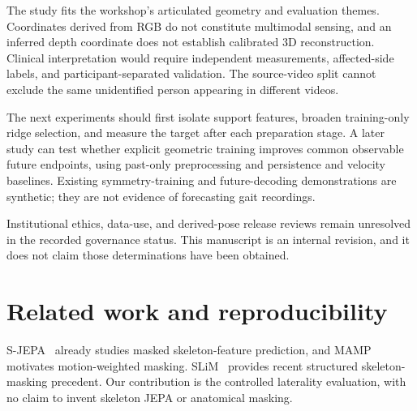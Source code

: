 \documentclass{article}
\begin{document}
The study fits the workshop's articulated geometry and evaluation themes. Coordinates derived from RGB do not constitute multimodal sensing, and an inferred depth coordinate does not establish calibrated 3D reconstruction. Clinical interpretation would require independent measurements, affected-side labels, and participant-separated validation. The source-video split cannot exclude the same unidentified person appearing in different videos.

The next experiments should first isolate support features, broaden training-only ridge selection, and measure the target after each preparation stage. A later study can test whether explicit geometric training improves common observable future endpoints, using past-only preprocessing and persistence and velocity baselines. Existing symmetry-training and future-decoding demonstrations are synthetic; they are not evidence of forecasting gait recordings.

Institutional ethics, data-use, and derived-pose release reviews remain unresolved in the recorded governance status. This manuscript is an internal revision, and it does not claim those determinations have been obtained.

\section{Related work and reproducibility}\label{related-work-and-reproducibility}

S-JEPA~\citep{ref04} already studies masked skeleton-feature prediction, and MAMP~\citep{ref05} motivates motion-weighted masking. SLiM~\citep{ref06} provides recent structured skeleton-masking precedent. Our contribution is the controlled laterality evaluation, with no claim to invent skeleton JEPA or anatomical masking.
\end{document}
